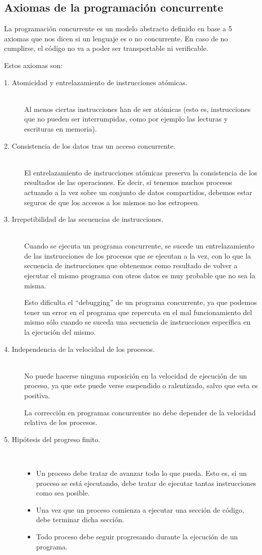 \subsection{Axiomas de la programación concurrente}
La programación concurrente es un modelo abstracto definido en base a 5 axiomas que nos dicen si un lenguaje es o no concurrente. En caso de no cumplirse, el código no va a poder ser transportable ni verificable.

Estos axiomas son:
\begin{description}
    \item [1. Atomicidad y entrelazamiento de instrucciones atómicas.]~\\
        Al menos ciertas instrucciones han de ser atómicas (esto es, instrucciones que no pueden ser interrumpidas, como por ejemplo las lecturas y escrituras en memoria).
    \item [2. Consistencia de los datos tras un acceso concurrente.]~\\
        El entrelazamiento de instrucciones atómicas preserva la
        consistencia de los resultados de las operaciones. 
        Es decir, si tenemos muchos procesos actuando a la vez sobre un conjunto de datos compartidos, debemos estar seguros de que los accesos a los mismos no los estropeen.
    \item [3. Irrepetibilidad de las secuencias de instrucciones.]~\\
        Cuando se ejecuta un programa concurrente, se sucede un entrelazamiento de las instrucciones de los procesos que se ejecutan a la vez, con lo que la secuencia de instrucciones que obtenemos como resultado de volver a ejecutar el mismo programa con otros datos es muy probable que no sea la misma.

        Esto dificulta el ``debugging'' de un programa concurrente, ya que podemos tener un error en el programa que repercuta en el mal funcionamiento del mismo sólo cuando se suceda una secuencia de instrucciones específica en la ejecución del mismo.
    \item [4. Independencia de la velocidad de los procesos.]~\\
        No puede hacerse ninguna suposición en la velocidad de ejecución de un proceso, ya que este puede verse suspendido o ralentizado, salvo que esta es positiva.

        La corrección en programas concurrentes no debe depender de la velocidad relativa de los procesos.
    \item [5. Hipótesis del progreso finito.]~
        \begin{itemize}
            \item Un proceso debe tratar de avanzar todo lo que pueda. Esto es, si un proceso se está ejecutando, debe tratar de ejecutar tantas instrucciones como sea posible.
            \item Una vez que un proceso comienza a ejecutar una sección de código, debe terminar dicha sección.
            \item Todo proceso debe seguir progresando durante la ejecución de un programa.
        \end{itemize}
\end{description}

